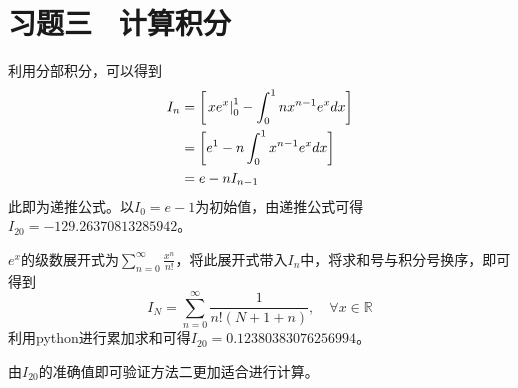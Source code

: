 \section{习题三 \ 计算积分}
利用分部积分，可以得到
\begin{align}
    I_n & = \left[\left.xe^x\right|^{1}_{0} - \int^{1}_{0}nx^{n-1}e^xdx \right] \\
        & = \left[e^1 - n\int^{1}_{0}x^{n-1}e^xdx\right] \notag                 \\
        & = e-nI_{n-1} \notag
\end{align}
此即为递推公式。以$I_0=e-1$为初始值，由递推公式可得$I_{20}=-129.26370813285942$。

$e^x$的级数展开式为$\sum_{n=0}^{\infty}\frac{x^n}{n!}$，将此展开式带入$I_n$中，将求和号与积分号换序，即可得到
\begin{equation}
    I_N=\sum_{n=0}^{\infty} \frac{1}{n !(N+1+n)}, \quad \forall x \in \mathbb{R}
\end{equation}
利用python进行累加求和可得$I_{20}=0.12380383076256994$。

由$I_{20}$的准确值即可验证方法二更加适合进行计算。